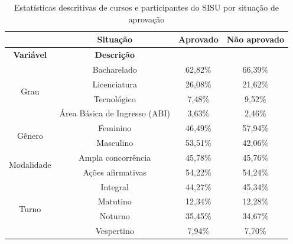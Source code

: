 \begin{table}[h]
    \centering
    \begin{tabular}{cccc}
    \hline
    \textbf{}                   & \textbf{Situação}             & Aprovado  & Não aprovado \\ \hline
    \textbf{Variável}           & \textbf{Descrição}            & \textbf{} & \textbf{}    \\ \hline
    \multirow{4}{*}{Grau}       & Bacharelado                   & 62,82\%   & 66,39\%      \\ \cline{2-4} 
                                & Licenciatura                  & 26,08\%   & 21,62\%      \\ \cline{2-4} 
                                & Tecnológico                   & 7,48\%    & 9,52\%       \\ \cline{2-4} 
                                & Área Básica de Ingresso (ABI) & 3,63\%    & 2,46\%       \\ \hline
    \multirow{2}{*}{Gênero}     & Feminino                      & 46,49\%   & 57,94\%      \\ \cline{2-4} 
                                & Masculino                     & 53,51\%   & 42,06\%      \\ \hline
    \multirow{2}{*}{Modalidade} & Ampla concorrência            & 45,78\%   & 45,76\%      \\ \cline{2-4} 
                                & Ações afirmativas             & 54,22\%   & 54,24\%      \\ \hline
    \multirow{4}{*}{Turno}      & Integral                      & 44,27\%   & 45,34\%      \\ \cline{2-4} 
                                & Matutino                      & 12,34\%   & 12,28\%      \\ \cline{2-4} 
                                & Noturno                       & 35,45\%   & 34,67\%      \\ \cline{2-4} 
                                & Vespertino                    & 7,94\%    & 7,70\%       \\ \hline
    \end{tabular}
    \caption{Estatísticas descritivas de cursos e participantes do SISU por situação de aprovação}
    \label{tab:estatistica-sisu}
    \end{table}

